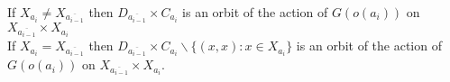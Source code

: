 \documentclass[preview]{standalone}
\begin{document}
If $X_{a_{i}} \not= X_{\overline{a_{i-1}}}$ then $D_{\overline{a_{i-1}}} \times C_{a_{i}}$ is an orbit of the action of $G(o(a_{i}))$ on $X_{\overline{a_{i-1}}} \times X_{a_{i}}$\\If $X_{a_{i}} = X_{\overline{a_{i-1}}}$ then $D_{\overline{a_{i-1}}} \times C_{a_{i}} \backslash \{(x, x) : x \in X_{a_{i}}\}$ is an orbit of the action of $G(o(a_{i}))$ on $X_{\overline{a_{i-1}}} \times X_{a_{i}}$.\\
\end{document}
